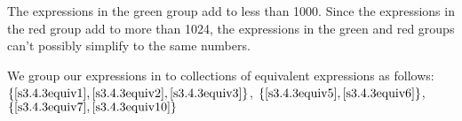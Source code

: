 \begin{solution}
\begin{itemize}
The expressions in the green group add to less than 1000. Since the expressions in the red group add to more than 1024, the expressions in the green and red groups can't possibly simplify to the same numbers.
\end{itemize}
We group our expressions in to collections of equivalent expressions as follows:\\
\textcolor{blue}{$\{\eqref{s3.4.3equiv1},\eqref{s3.4.3equiv2},
\eqref{s3.4.3equiv3}\}$},
\textcolor{red}{$\{\eqref{s3.4.3equiv5},\eqref{s3.4.3equiv6}\}$},
\textcolor{green}{$\{\eqref{s3.4.3equiv7},\eqref{s3.4.3equiv10}\}$}
\end{solution}
